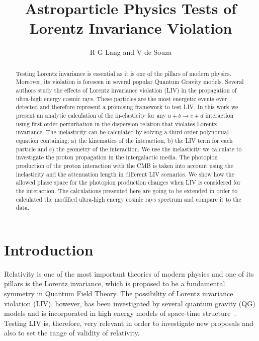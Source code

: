 \documentclass[a4paper]{jpconf}
\begin{document}
\title{Astroparticle Physics Tests of Lorentz Invariance Violation}

\author{R G Lang and V de Souza}

\address{Instituto de F\'isica de S\~ao Carlos, Universidade de S\~ao Paulo. Avenida Trabalhador S\~ao-Carlense, 400, S\~ao Carlos, SP, Brazil}


\begin{abstract}
Testing Lorentz invariance is essential as it is one of the pillars of modern physics. Moreover, its violation is foreseen in several popular Quantum Gravity models. Several authors study the effects of Lorentz invariance violation (LIV) in the propagation of ultra-high energy cosmic rays. These particles are the most energetic events ever detected and therefore represent a promising framework to test LIV. In this work we present an analytic calculation of the in-elasticity for any $a+b \rightarrow c+d$ interaction using first order perturbation in the dispersion relation that violates Lorentz invariance. The inelasticity can be calculated by solving a third-order polynomial equation containing: a) the kinematics of the interaction, b) the LIV term for each particle and c) the geometry of the interaction. We use the inelasticity we calculate to investigate the proton propagation in the intergalactic media. The photopion production of the proton interaction with the CMB is taken into account using the inelasticity and the attenuation length in different LIV scenarios. We show how the allowed phase space for the photopion production changes when LIV is considered for the interaction. The calculations presented here are going to be extended in order to calculated the  modified ultra-high energy cosmic rays spectrum and compare it to the data.
\end{abstract}

\section{Introduction}
Relativity is one of the most important theories of modern physics and one of its pillars is the Lorentz invariance, which is proposed to be a fundamental symmetry in Quantum Field Theory. The possibility of Lorentz invariance violation (LIV), however, has been investigated by several quantum gravity (QG) models and is incorporated in high energy models of space-time structure~\cite{Mattingly2005}. Testing LIV is, therefore, very relevant in order to investigate new proposals and also to set the range of validity of relativity.
\end{document}
